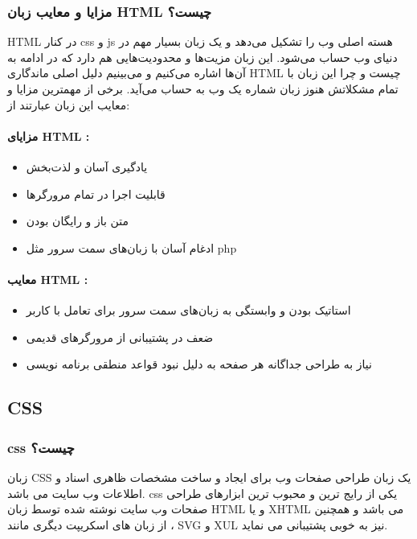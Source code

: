 \subsubsection{مزایا و معایب زبان HTML چیست؟}
HTML در کنار css و js هسته اصلی وب را تشکیل می‌دهد و یک زبان بسیار مهم در دنیای وب حساب می‌شود. این زبان مزیت‌ها و محدودیت‌هایی هم دارد که در ادامه به آن‌ها اشاره می‌کنیم و می‌بینیم دلیل اصلی ماندگاری HTML چیست و چرا این زبان با تمام مشکلاتش هنوز زبان شماره یک وب به حساب می‌آید. برخی از مهمترین مزایا و معایب این زبان عبارتند از:

\paragraph{مزایای HTML :}
\begin{itemize}
	\item 
	یادگیری آسان و لذت‌بخش
	\item 
	قابلیت اجرا در تمام مرورگرها
	\item 
	متن باز و رایگان بودن
	\item 
	ادغام آسان با زبان‌های سمت سرور مثل php
\end{itemize}


\paragraph{معایب HTML :}
\begin{itemize}
	\item 
	استاتیک بودن و وابستگی به زبان‌های سمت سرور برای تعامل با کاربر
	\item 
	ضعف در پشتیبانی از مرورگرهای قدیمی
	\item 
	نیاز به طراحی جداگانه هر صفحه به دلیل نبود قواعد منطقی برنامه نویسی
\end{itemize}


\subsection{CSS}
\subsubsection{css چیست؟}
 زبان 
 CSS
  یک زبان طراحی صفحات وب برای ایجاد و ساخت مشخصات ظاهری اسناد و اطلاعات وب سایت می باشد. css یکی از رایج ترین و محبوب ترین ابزارهای طراحی صفحات وب سایت نوشته شده توسط زبان HTML و یا XHTML می باشد و همچنین از زبان های اسکریپت دیگری مانند ، SVG
  و XUL نیز به خوبی پشتیبانی می نماید.

